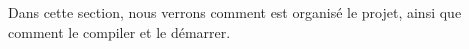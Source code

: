 Dans cette section, nous verrons comment est organisé le projet, ainsi que comment le compiler et le démarrer.